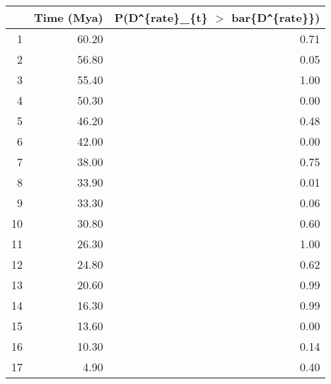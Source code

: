\begin{table}[ht]
\centering
\begin{tabular}{rrr}
  \hline
 & Time (Mya) & P(D\verb|^|\{rate\}\_\{t\} $>$ bar\{D\verb|^|\{rate\}\}) \\ 
  \hline
1 & 60.20 & 0.71 \\ 
  2 & 56.80 & 0.05 \\ 
  3 & 55.40 & 1.00 \\ 
  4 & 50.30 & 0.00 \\ 
  5 & 46.20 & 0.48 \\ 
  6 & 42.00 & 0.00 \\ 
  7 & 38.00 & 0.75 \\ 
  8 & 33.90 & 0.01 \\ 
  9 & 33.30 & 0.06 \\ 
  10 & 30.80 & 0.60 \\ 
  11 & 26.30 & 1.00 \\ 
  12 & 24.80 & 0.62 \\ 
  13 & 20.60 & 0.99 \\ 
  14 & 16.30 & 0.99 \\ 
  15 & 13.60 & 0.00 \\ 
  16 & 10.30 & 0.14 \\ 
  17 & 4.90 & 0.40 \\ 
   \hline
\end{tabular}
\label{tab:rate_peak}
\end{table}
